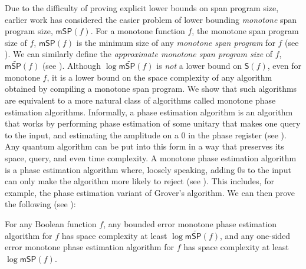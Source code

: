 \documentclass{toc}
\begin{document}
Due to the difficulty of proving explicit lower bounds on span program size, earlier work has considered the easier problem of lower bounding \emph{monotone} span program size, $\mathsf{mSP}(f)$. For a monotone function $f$, the monotone span program size of $f$, $\mathsf{mSP}(f)$ is the minimum size of any \emph{monotone span program} for $f$ (see ). We can similarly define the \emph{approximate monotone span program size} of $f$, $\mathsf{m}\widetilde{\mathsf{SP}}(f)$ (see ). Although $\log\mathsf{m}\widetilde{\mathsf{SP}}(f)$ is \emph{not} a lower bound on $\mathsf{S}(f)$, even for monotone $f$, it is a lower bound on the space complexity of any algorithm obtained by compiling a monotone span program. We show that such algorithms are equivalent to a more natural class of algorithms called monotone phase estimation algorithms. Informally, a phase estimation algorithm is an algorithm that works by performing phase estimation of some unitary that makes one query to the input, and estimating the amplitude on a 0 in the phase register (see ). Any quantum algorithm can be put into this form in a way that preserves its space, query, and even time complexity. A monotone phase estimation algorithm is a phase estimation algorithm where, loosely speaking, adding 0s to the input can only make the algorithm more likely to reject (see ). This includes, for example, the phase estimation variant of Grover's algorithm. We can then prove the following (see ):
\begin{theorem}[Informal]
For any Boolean function $f$, any bounded error monotone phase estimation algorithm for $f$ has space complexity at least $\log\mathsf{m}\widetilde{\mathsf{SP}}(f)$, and any one-sided error monotone phase estimation algorithm for $f$ has space complexity at least $\log\mathsf{mSP}(f)$. 
\end{theorem}
\end{document}
